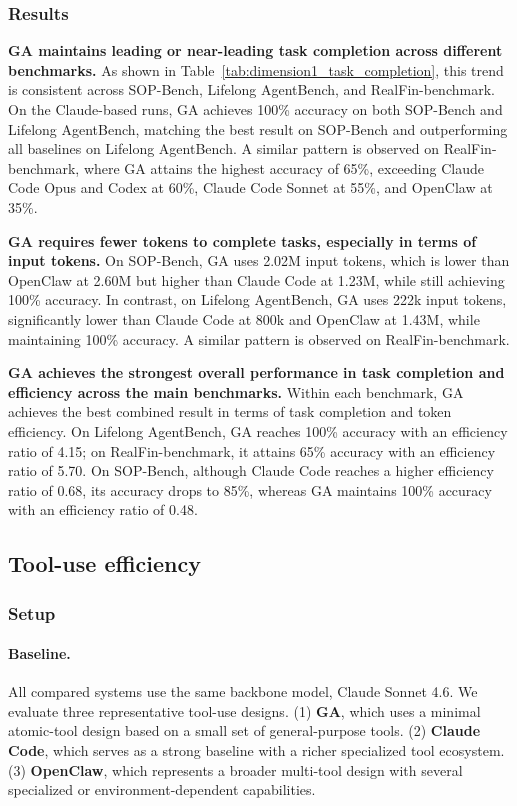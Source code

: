 \subsubsection{Results}
\label{sec:exp_task_completion_results}
\textbf{GA maintains leading or near-leading task completion across different benchmarks.}
As shown in Table~\ref{tab:dimension1_task_completion}, this trend is consistent across SOP-Bench, Lifelong AgentBench, and RealFin-benchmark. On the Claude-based runs, GA achieves 100\% accuracy on both SOP-Bench and Lifelong AgentBench, matching the best result on SOP-Bench and outperforming all baselines on Lifelong AgentBench. A similar pattern is observed on RealFin-benchmark, where GA attains the highest accuracy of 65\%, exceeding Claude Code Opus and Codex at 60\%, Claude Code Sonnet at 55\%, and OpenClaw at 35\%.

\textbf{GA requires fewer tokens to complete tasks, especially in terms of input tokens.}
On SOP-Bench, GA uses 2.02M input tokens, which is lower than OpenClaw at 2.60M but higher than Claude Code at 1.23M, while still achieving 100\% accuracy. In contrast, on Lifelong AgentBench, GA uses 222k input tokens, significantly lower than Claude Code at 800k and OpenClaw at 1.43M, while maintaining 100\% accuracy. A similar pattern is observed on RealFin-benchmark.

\textbf{GA achieves the strongest overall performance in task completion and efficiency across the main benchmarks.}
Within each benchmark, GA achieves the best combined result in terms of task completion and token efficiency. On Lifelong AgentBench, GA reaches 100\% accuracy with an efficiency ratio of 4.15; on RealFin-benchmark, it attains 65\% accuracy with an efficiency ratio of 5.70. On SOP-Bench, although Claude Code reaches a higher efficiency ratio of 0.68, its accuracy drops to 85\%, whereas GA maintains 100\% accuracy with an efficiency ratio of 0.48.

\subsection{Tool-use efficiency}
\label{sec:dimension4_tool_use_efficiency}
\subsubsection{Setup}
\label{sec:exp_tooluse_setup}

\paragraph{Baseline.}
All compared systems use the same backbone model, Claude Sonnet 4.6. We evaluate three representative tool-use designs. (1) \textbf{GA}, which uses a minimal atomic-tool design based on a small set of general-purpose tools. (2) \textbf{Claude Code}, which serves as a strong baseline with a richer specialized tool ecosystem. (3) \textbf{OpenClaw}, which represents a broader multi-tool design with several specialized or environment-dependent capabilities.

